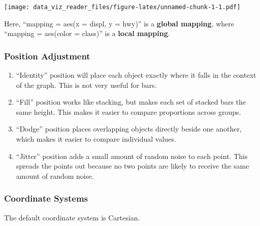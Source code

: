 \documentclass[]{book}
\providecommand{\tightlist}{%
  \setlength{\itemsep}{0pt}\setlength{\parskip}{0pt}}
\begin{document}
\texttt{[image: data\_viz\_reader\_files/figure-latex/unnamed-chunk-1-1.pdf]}

Here, ``mapping = aes(x = displ, y = hwy)'' is a \textbf{global mapping}, where ``mapping = aes(color = class)'' is a \textbf{local mapping}.

\hypertarget{position-adjustment}{%
\subsubsection{Position Adjustment}\label{position-adjustment}}

\begin{enumerate}
\def\labelenumi{\alph{enumi})}
\tightlist
\item
  ``Identity'' position will place each object exactly where it falls in the context of the graph. This is not very useful for bars.
\item
  ``Fill'' position works like stacking, but makes each set of stacked bars the same height. This makes it easier to compare proportions across groups.
\item
  ``Dodge'' position places overlapping objects directly beside one another, which makes it easier to compare individual values.
\item
  ``Jitter'' position adds a small amount of random noise to each point. This spreads the points out because no two points are likely to receive the same amount of random noise.
\end{enumerate}

\hypertarget{coordinate-systems}{%
\subsubsection{Coordinate Systems}\label{coordinate-systems}}

The default coordinate system is Cartesian.
\end{document}
